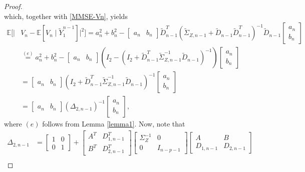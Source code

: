 \documentclass[12pt]{article}
\newcommand{\E}{\mathbb{E}}
\begin{document}
\begin{proof}
\begin{equation*}
\end{equation*}
which, together with \eqref{MMSE-Vn}, yields
\begin{equation}\label{MMSE-Vn-final}
   \begin{aligned}
      \E[\vert& V_n-\E[V_n\mid \widetilde{Y}_1^{n-1}]\vert^2]=a_n^2+b_n^2-\begin{bmatrix}a_n&b_n\end{bmatrix}\widetilde{D}^T_{n-1}\left(\widetilde{\Sigma}_{Z,n-1}+\widetilde{D}_{n-1}\widetilde{D}^T_{n-1}\right)^{-1}\widetilde{D}_{n-1}\begin{bmatrix}a_n\\[2pt]b_n\end{bmatrix}\\ 
&\overset{(e)}{=}a_n^2+b_n^2-\begin{bmatrix}a_n &b_n\end{bmatrix}\left(I_2 - (I_2 +\widetilde{D}^T_{n-1}\widetilde{\Sigma}_{Z,n-1}^{-1}\widetilde{D}_{n-1})^{-1}\right)\begin{bmatrix}a_n\\[2pt]b_n\end{bmatrix}\\
&=\begin{bmatrix}a_n&b_n\end{bmatrix}\left(I_2 +\widetilde{D}^T_{n-1}\widetilde{\Sigma}_{Z,n-1}^{-1}\widetilde{D}_{n-1}\right)^{-1}      \begin{bmatrix}a_n\\[2pt]b_n\end{bmatrix}\\
&=\begin{bmatrix}a_n&b_n\end{bmatrix}(\Delta_{2,n-1})^{-1} \begin{bmatrix}a_n\\[2pt]b_n\end{bmatrix},
\end{aligned}
\end{equation}
where $(e)$ follows from Lemma \ref{lemma1}. Now, note that
\begin{equation*}
\begin{aligned}
\Delta_{2,n-1}&=\begin{bmatrix}1&0\\[2pt]0&1\end{bmatrix}+ \begin{bmatrix}A^T&D_{1,n-1}^T\\[2pt]B^T&D_{2,n-1}^T \end{bmatrix}
\begin{bmatrix}\Sigma_Z^{-1}&0\\[2pt]0&I_{n-p-1}\end{bmatrix}\begin{bmatrix}A&B\\[2pt]D_{1,n-1}&D_{2,n-1}\end{bmatrix}\\

\end{aligned}
\end{equation*}
\end{proof}
\end{document}
